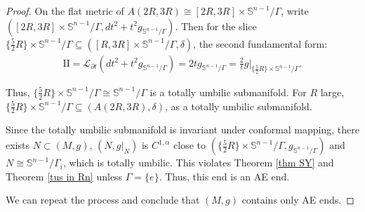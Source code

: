 \documentclass[12pt]{amsart}
\theoremstyle{definition}
\begin{document}
\begin{proof}


    On the flat metric of $A(2R,3R)\cong [2R,3R]\times \mathbb{S}^{n-1}/\Gamma$, write $([2R,3R]\times \mathbb{S}^{n-1}/\Gamma,dt^2+t^2 g_{\mathbb{S}^{n-1}/\Gamma})$.
  Then for the slice $\{\frac{5}{2}R\}\times\mathbb{S}^{n-1}/\Gamma\subseteq([R,3R]\times\mathbb{S}^{n-1}/\Gamma,\delta)$, the second fundamental form:
  \begin{align*}
        \text{II} = \mathcal{L}_{\partial t}(dt^2 + t^2 g_{\mathbb{S}^{n-1}/\Gamma}) = 2t g_{\mathbb{S}^{n-1}/\Gamma} = \frac{2}{t} g|_{\{\frac{5}{2}R\}\times\mathbb{S}^{n-1}/\Gamma}.
  \end{align*}
  
  Thus, $\{\frac{5}{2}R\}\times\mathbb{S}^{n-1}/\Gamma\cong\mathbb{S}^{n-1}/\Gamma$ is a totally umbilic submanifold. For $R$ large, $\{\frac{5}{2}R\}\times\mathbb{S}^{n-1}/\Gamma\subseteq(A(2R,3R),\delta)$, as a totally umbilic submanifold.
  
  Since the totally umbilic submanifold is invariant under conformal mapping, there exists $N\subset(M,g)$, $(N,g|_N)$ is $C^{1,\alpha}$ close to $(\{\frac{5}{2}R\}\times\mathbb{S}^{n-1}/\Gamma,g_{\mathbb{S}^{n-1}/\Gamma})$ and $N\cong\mathbb{S}^{n-1}/\Gamma_i$, which is totally umbilic. This violates Theorem \ref{thm SY}
  and Theorem \ref{tus in Rn} unless $\Gamma = \{e\}$. Thus, this end is an AE end. 

  We can repeat the process and conclude that $(M,g)$ contains only AE ends.


\end{proof}
\end{document}

